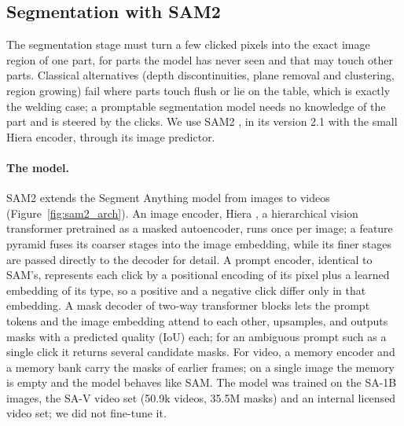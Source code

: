 \subsection{Segmentation with SAM2}
\label{sec:per_segment}
The segmentation stage must turn a few clicked pixels into the exact image region of one part,
for parts the model has never seen and that may touch other parts. Classical alternatives (depth
discontinuities, plane removal and clustering, region growing) fail where parts touch flush or lie
on the table, which is exactly the welding case; a promptable segmentation model needs no
knowledge of the part and is steered by the clicks. We use SAM2 \cite{ravi2024sam2}, in its
version 2.1 with the small Hiera encoder, through its image predictor.

\paragraph{The model.} SAM2 extends the Segment Anything model \cite{kirillov2023sam} from images
to videos (Figure~\ref{fig:sam2_arch}). An image encoder, Hiera \cite{ryali2023hiera}, a
hierarchical vision transformer pretrained as a masked autoencoder, runs once per image; a feature
pyramid fuses its coarser stages into the image embedding, while its finer stages are passed
directly to the decoder for detail. A prompt encoder, identical to SAM's, represents each click by
a positional encoding of its pixel plus a learned embedding of its type, so a positive and a
negative click differ only in that embedding. A mask decoder of two-way transformer blocks lets the
prompt tokens and the image embedding attend to each other, upsamples, and outputs masks with a
predicted quality (IoU) each; for an ambiguous prompt such as a single click it returns several
candidate masks. For video, a memory encoder and a memory bank carry the masks of earlier frames;
on a single image the memory is empty and the model behaves like SAM. The model was trained on the
SA-1B images, the SA-V video set (50.9k videos, 35.5M masks) and an internal licensed video set;
we did not fine-tune it.

